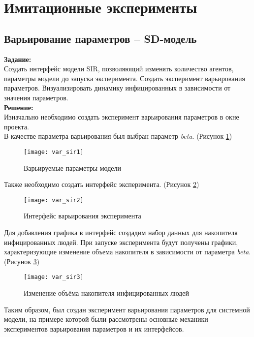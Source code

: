\section*{Имитационные эксперименты}
\subsection*{Варьирование параметров -- SD-модель}

\textbf{Задание:}\\
Создать интерфейс модели SIR, позволяющий изменять количество агентов, параметры модели до запуска эксперимента. Создать эксперимент варьирования параметров. Визуализировать динамику инфицированных в зависимости от значения параметров.\\

\textbf{Решение:}\\
Изначально необходимо создать эксперимент варьирования параметров в окне проекта.\\

В качестве параметра варьирования был выбран параметр \textit{beta}. (Рисунок \ref{fig:var_sir1})
\begin{figure}[h]
	\centering \texttt{[image: var\_sir1]}
	\caption{Варьируемые параметры модели}
	\label{fig:var_sir1}
\end{figure}

Также необходимо создать интерфейс эксперимента. (Рисунок \ref{fig:var_sir2})
\begin{figure}[h]
	\centering \texttt{[image: var\_sir2]}
	\caption{Интерфейс варьирования эксперимента}
	\label{fig:var_sir2}
\end{figure}

\newpage

Для добавления графика в интерфейс  создадим набор данных для накопителя инфицированных людей. При запуске эксперимента будут получены графики, характеризующие изменение объема накопителя в зависимости от параметра \textit{beta}. (Рисунок \ref{fig:var_sir3})
\begin{figure}[h]
	\centering \texttt{[image: var\_sir3]}
	\caption{Изменение объёма накопителя инфицированных людей}
	\label{fig:var_sir3}
\end{figure}

Таким образом, был создан эксперимент варьирования параметров для системной модели, на примере которой были рассмотрены основные механики экспериментов варьирования параметров и их интерфейсов. 